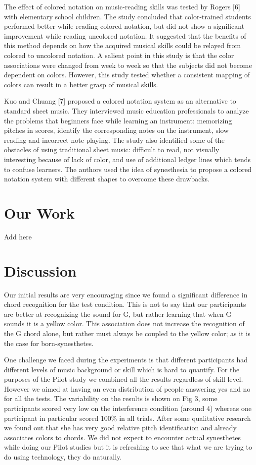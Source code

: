 \documentclass{sigchi}
\begin{document}
The effect of colored notation on music-reading skills was tested by Rogers [6] with elementary school children. The study concluded that color-trained students performed better while reading colored notation, but did not show a significant improvement while reading uncolored notation. It suggested that the benefits of this method depends on how the acquired musical skills could be relayed from colored to uncolored notation. A salient point in this study is that the color associations were changed from week to week so that the subjects did not become dependent on colors. However, this study tested whether a consistent mapping of colors can result in a better grasp of musical skills. 

Kuo and Chuang [7] proposed a colored notation system as an alternative to standard sheet music. They interviewed music education professionals to analyze the problems that beginners face while learning an instrument: memorizing pitches in scores, identify the corresponding notes on the instrument, slow reading and incorrect note playing. The study also identified some of the obstacles of using traditional sheet music: difficult to read, not visually interesting because of lack of color, and use of additional ledger lines which tends to confuse learners. The authors used the idea of synesthesia to propose a colored notation system with different shapes to overcome these drawbacks. 

\section{Our Work}

Add here

\section{Discussion}

Our initial results are very encouraging since we found a significant difference in chord recognition for the test condition. This is not to say that our participants are better at recognizing the sound for G, but rather learning that when G sounds it is a yellow color. This association does not increase the recognition of the G chord alone, but rather must always be coupled to the yellow color; as it is the case for born-synesthetes. 

One challenge we faced during the experiments is that different participants had different levels of music background or skill which is hard to quantify. For the purposes of the Pilot study we combined all the results regardless of skill level. However we aimed at having an even distribution of people answering yes and no for all the tests. The variability on the results is shown on Fig 3, some participants scored very low on the interference condition (around 4) whereas one participant in particular scored 100\% in all trials. After some qualitative research we found out that she has very good relative pitch identification and already associates colors to chords. We did not expect to encounter actual synesthetes while doing our Pilot studies but it is refreshing to see that what we are trying to do using technology, they do naturally.
\end{document}
